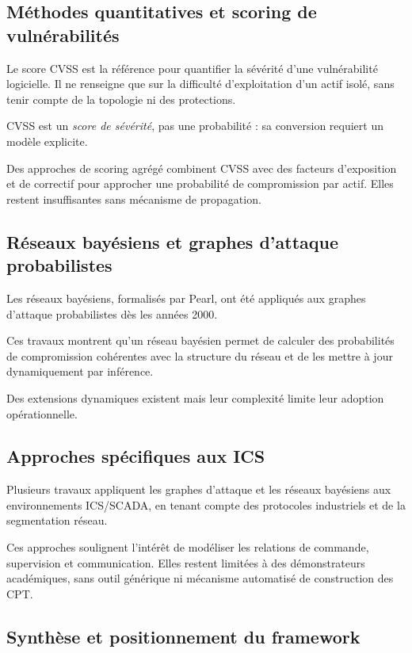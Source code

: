 \documentclass[12pt,a4paper]{article}
\newcommand{\forcereset}[1]{}
\begin{document}
\subsection{Méthodes quantitatives et scoring de vulnérabilités}
\forcereset{4}

Le score CVSS est la référence pour quantifier la sévérité d'une vulnérabilité logicielle. Il ne renseigne que sur la difficulté d'exploitation d'un actif isolé, sans tenir compte de la topologie ni des protections.

CVSS est un \emph{score de sévérité}, pas une probabilité : sa conversion requiert un modèle explicite.

Des approches de scoring agrégé combinent CVSS avec des facteurs d'exposition et de correctif pour approcher une probabilité de compromission par actif. Elles restent insuffisantes sans mécanisme de propagation.

\subsection{Réseaux bayésiens et graphes d'attaque probabilistes}
\forcereset{4}

Les réseaux bayésiens, formalisés par Pearl, ont été appliqués aux graphes d'attaque probabilistes dès les années 2000.

Ces travaux montrent qu'un réseau bayésien permet de calculer des probabilités de compromission cohérentes avec la structure du réseau et de les mettre à jour dynamiquement par inférence.

Des extensions dynamiques existent mais leur complexité limite leur adoption opérationnelle.

\subsection{Approches spécifiques aux ICS}
\forcereset{4}

Plusieurs travaux appliquent les graphes d'attaque et les réseaux bayésiens aux environnements ICS/SCADA, en tenant compte des protocoles industriels et de la segmentation réseau.

Ces approches soulignent l'intérêt de modéliser les relations de commande, supervision et communication. Elles restent limitées à des démonstrateurs académiques, sans outil générique ni mécanisme automatisé de construction des CPT.

\subsection{Synthèse et positionnement du framework}
\forcereset{5}
\end{document}
